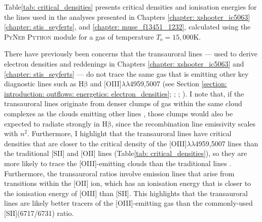 Table\;\ref{tab: critical_densities} presents critical densities and ionisation energies for the lines used in the analyses presented in Chapters \ref{chapter: xshooter_ic5063} \ref{chapter: stis_seyferts}, and \ref{chapter: muse_f13451_1232}, calculated using the \textsc{PyNeb Python} module \citep{Luridiana2015} for a gas of temperature $T_\mathrm{e}=15,000$\;K. 

There have previously been concerns that the transauroral lines --- used to derive electron densities and reddenings in Chapters \ref{chapter: xshooter_ic5063} and \ref{chapter: stis_seyferts} --- do not trace the same gas that is emitting other key diagnostic lines such as H$\mathrm{\beta}$ and [OIII]$\lambda\lambda$4959,5007 (see Section \ref{section: introduction: outflows: energetics: electron_densities}; \citealt{Sun2017}; \citealt{Rose2018}; \citealt{Spence2018}). I note that, if the transauroral lines originate from denser clumps of gas within the same cloud complexes as the clouds emitting other lines \citep{Sun2017}, those clumps would also be expected to radiate strongly in H$\mathrm{\beta}$, since the recombination line emissivity scales with $n^2$. Furthermore, I highlight that the transauroral lines have critical densities that are closer to the critical density of the [OIII]$\lambda\lambda$4959,5007 lines than the traditional [SII] and [OII] lines (Table\;\ref{tab: critical_densities}), so they are more likely to trace the [OIII]-emitting clouds than the traditional lines \citep{Rose2018, Spence2018}. Furthermore, the transauroral ratios involve emission lines that arise from transitions within the [OII] ion, which has an ionisation energy that is closer to the ionisation energy of [OIII] than [SII]. This highlights that the transauroral lines are likely better tracers of the [OIII]-emitting gas than the commonly-used [SII](6717/6731) ratio. \\

